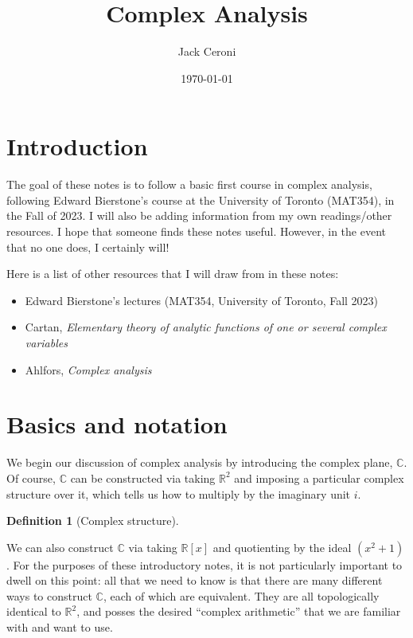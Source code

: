 \documentclass[aps,pra,showpacs,notitlepage,onecolumn,superscriptaddress,nofootinbib]{revtex4-1}
\theoremstyle{definition}
\newtheorem{definition}{Definition}[section]
\begin{document}
\title{Complex Analysis}
\author{Jack Ceroni}

\date{\today}

\maketitle

\tableofcontents

\section{Introduction}

\noindent The goal of these notes is to follow a basic first course in complex analysis, following Edward Bierstone's course at the University of Toronto (MAT354), in the Fall of 2023. I will
also be adding information from my own readings/other resources. I hope that someone finds these notes useful. However, in the event that no one does, I certainly will!

Here is a list of other resources that I will draw from in these notes:

\begin{itemize}
  \item Edward Bierstone's lectures (MAT354, University of Toronto, Fall 2023)
  \item Cartan, \textit{Elementary theory of analytic functions of one or several complex variables}
  \item Ahlfors, \textit{Complex analysis}
  \end{itemize}

\section{Basics and notation}

\noindent We begin our discussion of complex analysis by introducing the complex plane, $\mathbb{C}$. Of course, $\mathbb{C}$ can be constructed via taking $\mathbb{R}^{2}$ and imposing a particular
complex structure over it, which tells us how to multiply by the imaginary unit $i$.

\begin{definition}[Complex structure]
  \end{definition}

\noindent We can also construct $\mathbb{C}$ via taking $\mathbb{R}[x]$ and quotienting by the ideal $(x^2 + 1)$.
For the purposes of these introductory notes, it is not particularly important to dwell on this point: all that
we need to know is that there are many different ways to construct $\mathbb{C}$, each of which are equivalent. They are all topologically identical to $\mathbb{R}^2$, and posses the desired ``complex arithmetic'' that we are familiar with
and want to use.
\end{document}

